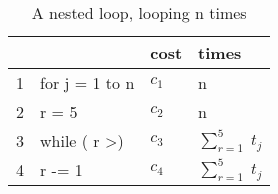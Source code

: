 \begin{center}
	\begin{table}[h]
		\centering
		\begin{tabular}{|l|l|l|l|}
			 \hline
			& & cost & times                      \\ \hline
			1 & for j = 1 to n            & $c_1$ & n                      \\ \hline
			2 & r = 5  & $c_2$ & n                   \\ \hline
			3 & while ( r \textgreater\;0) & $c_3$ & $\sum_{r=1}^{5}\;t_j$  \\ \hline
			4 & r -= 1                    & $c_4$ & $\sum_{r=1}^{5}\;t_j$  \\ \hline
		\end{tabular}
		\caption{A nested loop, looping n times}
		\label{tab:simpleCode}
	\end{table}
\end{center}